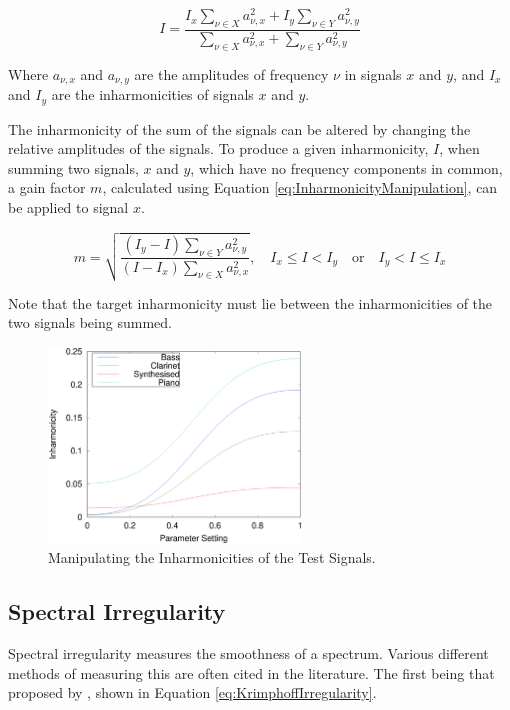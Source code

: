 		\begin{equation}
			I = \frac{I_{x}\sum_{\nu \in X} a_{\nu,x}^{2} + I_{y}\sum_{\nu \in Y} a_{\nu,y}^{2}}
			         {\sum_{\nu \in X} a_{\nu,x}^{2} + \sum_{\nu \in Y} a_{\nu,y}^{2}}
			\label{eq:InharmonicitySum}
		\end{equation}

		Where $a_{\nu,x}$ and $a_{\nu,y}$ are the amplitudes of frequency $\nu$ in signals $x$ and $y$, and $I_{x}$
		and $I_{y}$ are the inharmonicities of signals $x$ and $y$.

		The inharmonicity of the sum of the signals can be altered by changing the relative amplitudes of the
		signals. To produce a given inharmonicity, $I$, when summing two signals, $x$ and $y$, which have no
		frequency components in common, a gain factor $m$, calculated using Equation
		\ref{eq:InharmonicityManipulation}, can be applied to signal $x$.

		\begin{equation}
			m = \sqrt{\frac{(I_{y} - I)\sum_{\nu \in Y} a_{\nu,y}^{2}}
			               {(I - I_{x})\sum_{\nu \in X} a_{\nu,x}^{2}}},
			\quad I_{x} \leq I < I_{y} \quad \textrm{or} \quad I_{y} < I \leq I_{x}
			\label{eq:InharmonicityManipulation}
		\end{equation}

		Note that the target inharmonicity must lie between the inharmonicities of the two signals being summed.

		\begin{figure}[h!]
			\centering
			\includegraphics[width=0.6\textwidth]{chapter6/Images/MoveInharmonicities.eps}
			\caption{Manipulating the Inharmonicities of the Test Signals.}
			\label{fig:MoveInharmonicities}
		\end{figure}

	\subsection{Spectral Irregularity}
	\label{sec:FeatureControl-Parameterisation-Irregularity}
		Spectral irregularity measures the smoothness of a spectrum. Various different methods of measuring this
		are often cited in the literature. The first being that proposed by \citet{krimphoff1994caracterisation},
		shown in Equation \ref{eq:KrimphoffIrregularity}.

